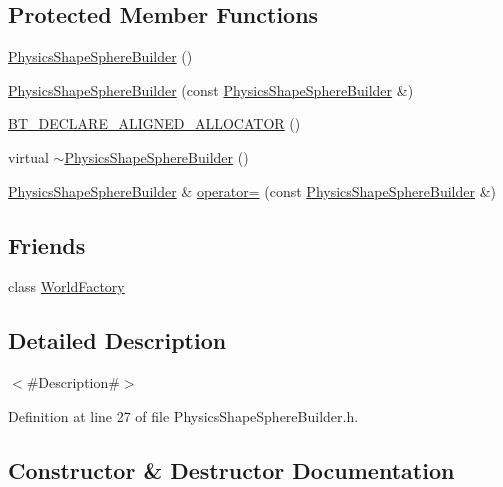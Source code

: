 \subsection*{Protected Member Functions}
\begin{DoxyCompactItemize}
\item 
\mbox{\hyperlink{classnjli_1_1_physics_shape_sphere_builder_ad86fb5aa86978d04e15b28b12ca92b18}{Physics\+Shape\+Sphere\+Builder}} ()
\item 
\mbox{\hyperlink{classnjli_1_1_physics_shape_sphere_builder_af935e9e37ed4f4214bbafd3df47ec0ad}{Physics\+Shape\+Sphere\+Builder}} (const \mbox{\hyperlink{classnjli_1_1_physics_shape_sphere_builder}{Physics\+Shape\+Sphere\+Builder}} \&)
\item 
\mbox{\hyperlink{classnjli_1_1_physics_shape_sphere_builder_a393a4aad91017156bf81d1803f13193f}{B\+T\+\_\+\+D\+E\+C\+L\+A\+R\+E\+\_\+\+A\+L\+I\+G\+N\+E\+D\+\_\+\+A\+L\+L\+O\+C\+A\+T\+OR}} ()
\item 
virtual \mbox{\hyperlink{classnjli_1_1_physics_shape_sphere_builder_a13b0cc141e26037f2bf71f8c6863cd82}{$\sim$\+Physics\+Shape\+Sphere\+Builder}} ()
\item 
\mbox{\hyperlink{classnjli_1_1_physics_shape_sphere_builder}{Physics\+Shape\+Sphere\+Builder}} \& \mbox{\hyperlink{classnjli_1_1_physics_shape_sphere_builder_a94aee97d067c834b14bedda7c2403ee3}{operator=}} (const \mbox{\hyperlink{classnjli_1_1_physics_shape_sphere_builder}{Physics\+Shape\+Sphere\+Builder}} \&)
\end{DoxyCompactItemize}
\subsection*{Friends}
\begin{DoxyCompactItemize}
\item 
class \mbox{\hyperlink{classnjli_1_1_physics_shape_sphere_builder_acb96ebb09abe8f2a37a915a842babfac}{World\+Factory}}
\end{DoxyCompactItemize}


\subsection{Detailed Description}
$<$\#\+Description\#$>$ 

Definition at line 27 of file Physics\+Shape\+Sphere\+Builder.\+h.



\subsection{Constructor \& Destructor Documentation}
\mbox{\label{classnjli_1_1_physics_shape_sphere_builder_ad86fb5aa86978d04e15b28b12ca92b18}} 

